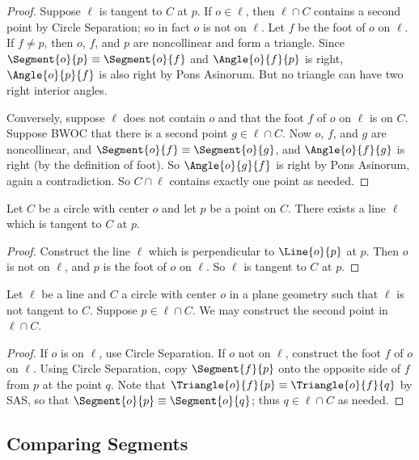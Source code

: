 \documentclass{article}
\begin{document}
\begin{proof}
Suppose $\ell$ is tangent to $C$ at $p$. If $o \in \ell$, then $\ell \cap C$ contains a second point by Circle Separation; so in fact $o$ is not on $\ell$. Let $f$ be the foot of $o$ on $\ell$. If $f \neq p$, then $o$, $f$, and $p$ are noncollinear and form a triangle. Since $\Segment{o}{p} \equiv \Segment{o}{f}$ and $\Angle{o}{f}{p}$ is right, $\Angle{o}{p}{f}$ is also right by Pons Asinorum. But no triangle can have two right interior angles.

Conversely, suppose $\ell$ does not contain $o$ and that the foot $f$ of $o$ on $\ell$ is on $C$. Suppose BWOC that there is a second point $g \in \ell \cap C$. Now $o$, $f$, and $g$ are noncollinear, and $\Segment{o}{f} \equiv \Segment{o}{g}$, and $\Angle{o}{f}{g}$ is right (by the definition of foot). So $\Angle{o}{g}{f}$ is right by Pons Asinorum, again a contradiction. So $C \cap \ell$ contains exactly one point as needed. 
\end{proof}

\begin{construct}
Let $C$ be a circle with center $o$ and let $p$ be a point on $C$. There exists a line $\ell$ which is tangent to $C$ at $p$.
\end{construct}

\begin{proof}
Construct the line $\ell$ which is perpendicular to $\Line{o}{p}$ at $p$. Then $o$ is not on $\ell$, and $p$ is the foot of $o$ on $\ell$. So $\ell$ is tangent to $C$ at $p$.
\end{proof}

\begin{construct}
Let $\ell$ be a line and $C$ a circle with center $o$ in a plane geometry such that $\ell$ is not tangent to $C$. Suppose $p \in \ell \cap C$. We may construct the second point in $\ell \cap C$.
\end{construct}

\begin{proof}
If $o$ is on $\ell$, use Circle Separation. If $o$ not on $\ell$, construct the foot $f$ of $o$ on $\ell$. Using Circle Separation, copy $\Segment{f}{p}$ onto the opposite side of $f$ from $p$ at the point $q$. Note that $\Triangle{o}{f}{p} \equiv \Triangle{o}{f}{q}$ by SAS, so that $\Segment{o}{p} \equiv \Segment{o}{q}$; thus $q \in \ell \cap C$ as needed.
\end{proof}

\subsection*{Comparing Segments}
\end{document}
